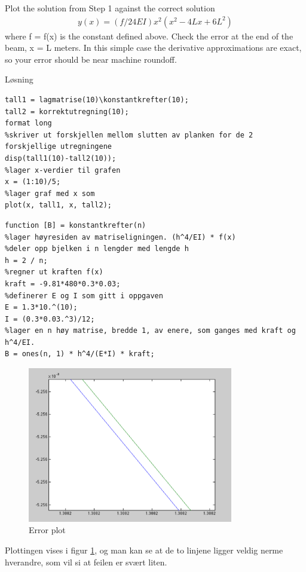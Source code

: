 % 

Plot the solution from Step 1 against the correct solution
\begin{align}
	y(x) = (f/24EI)x^2(x^2 − 4Lx + 6L^2)
\end{align}
where f = f(x) is the constant defined above.
\newline
\newline
Check the error at the end of the beam, x = L meters. In this simple case the derivative approximations are exact, so your error should be near machine roundoff.

\vspace{5mm}
Løsning

\begin{lstlisting}[caption={oppgave2.m}]
tall1 = lagmatrise(10)\konstantkrefter(10);
tall2 = korrektutregning(10);
format long
%skriver ut forskjellen mellom slutten av planken for de 2 forskjellige utregningene
disp(tall1(10)-tall2(10));
%lager x-verdier til grafen
x = (1:10)/5;
%lager graf med x som
plot(x, tall1, x, tall2); 
\end{lstlisting}

\begin{lstlisting}[caption={konstantkrefter.m}]
function [B] = konstantkrefter(n)
%lager høyresiden av matriseligningen. (h^4/EI) * f(x) 
%deler opp bjelken i n lengder med lengde h 
h = 2 / n;        
%regner ut kraften f(x) 
kraft = -9.81*480*0.3*0.03; 
%definerer E og I som gitt i oppgaven
E = 1.3*10.^(10); 
I = (0.3*0.03.^3)/12; 
%lager en n høy matrise, bredde 1, av enere, som ganges med kraft og h^4/EI.
B = ones(n, 1) * h^4/(E*I) * kraft;
\end{lstlisting}

\vspace{3mm}


\begin{figure}[h]
    \centering
    \includegraphics[width=0.8\textwidth]{sections/Exercise2/errorplot2}
    \caption{Error plot}
    \label{fig:errorplot2}
\end{figure}
 
Plottingen vises i figur \ref{fig:errorplot2}, og man kan se at de to linjene ligger veldig nerme hverandre, som vil si at feilen er svært liten.


% 